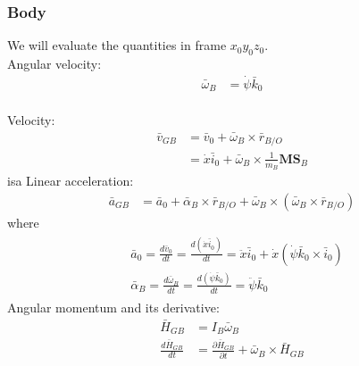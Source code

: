\documentclass[a4paper,10pt]{article}
\begin{document}
\subsubsection{Body}
We will evaluate the quantities in frame $x_0y_0z_0$. \\
Angular velocity:
\begin{align}
 \bar{\omega}_B &= \dot\psi\bar{k}_0 
\end{align}
\\Velocity:
\begin{align}
  \bar{v}_{GB} &= \bar{v}_0 + \bar{\omega}_B \times \bar{r}_{B/O} \nonumber \\
  &= \dot{x}\bar{i}_0 + \bar{\omega}_B \times \frac{1}{m_B}\mathbf{MS}_{B} 
\end{align}isa
Linear acceleration:
\begin{align}
 \bar{a}_{GB} &= \bar{a}_0 + \bar\alpha_B \times \bar{r}_{B/O} + \bar\omega_B \times \left( \bar\omega_B \times \bar{r}_{B/O}\right) 
\end{align}
where 
\begin{align} \begin{split}
 &\bar{a}_0 = \frac{d\bar{v}_0}{dt} = \frac{d\left(\dot{x}\bar{i}_0\right)}{dt} 
 = \ddot{x}\bar{i}_0+\dot{x}\left(\dot\psi\bar{k}_0 \times \bar{i}_0\right)  \\
 &\bar\alpha_B = \frac{d\bar{\omega}_B}{dt} = \frac{d\left(\dot\psi\bar{k}_0 \right)}{dt}
 = \ddot\psi\bar{k}_0  \label{a0alphaB}
\end{split} \end{align}
Angular momentum and its derivative:
\begin{align}
 \bar{H}_{GB} &= I_B\bar{\omega}_B \nonumber \\
 \frac{d\bar{H}_{GB}}{dt} &= \frac{\partial \bar{H}_{GB}}{\partial t} + \bar\omega_B \times \bar{H}_{GB} \label{kanesLHSVariableEnd}
\end{align}
\end{document}
